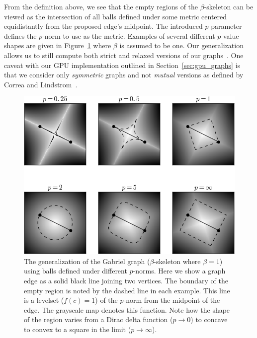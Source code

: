 From the definition above, we see that the empty regions of the $\beta$-skeleton can be viewed as the intersection of all balls defined under some metric centered equidistantly from the proposed edge's midpoint.
%
The introduced $p$ parameter defines the $p$-norm to use as the metric.
%
Examples of several different $p$ value shapes are given in Figure~\ref{fig:gabriel_p_shapes} where $\beta$ is assumed to be one.
%
Our generalization allows us to still compute both strict and relaxed versions of our graphs~\cite{CorreaLindstrom2011}.
%
One caveat with our GPU implementation outlined in Section~\ref{sec:gpu_graphs} is that we consider only \textit{symmetric} graphs and not \textit{mutual} versions as defined by Correa and Lindstrom~\cite{CorreaLindstrom2011}.

\begin{figure}[!b]
    \includegraphics[width=\linewidth]{figs/chap7/emptyRegions}
    \caption[Example $L_p$-norm functions]{The generalization of the Gabriel graph ($\beta$-skeleton where $\beta=1$) using balls defined under different $p$-norms.
    Here we show a graph edge as a solid black line joining two vertices.
    The boundary of the empty region is noted by the dashed line in each example.
    This line is a levelset ($f(c)=1$) of the $p$-norm from the midpoint of the edge.
    The grayscale map denotes this function.
    Note how the shape of the region varies from a Dirac delta function ($p \rightarrow 0$) to concave to convex to a square in the limit ($p \rightarrow \infty$).}
    \label{fig:gabriel_p_shapes}
\end{figure}


